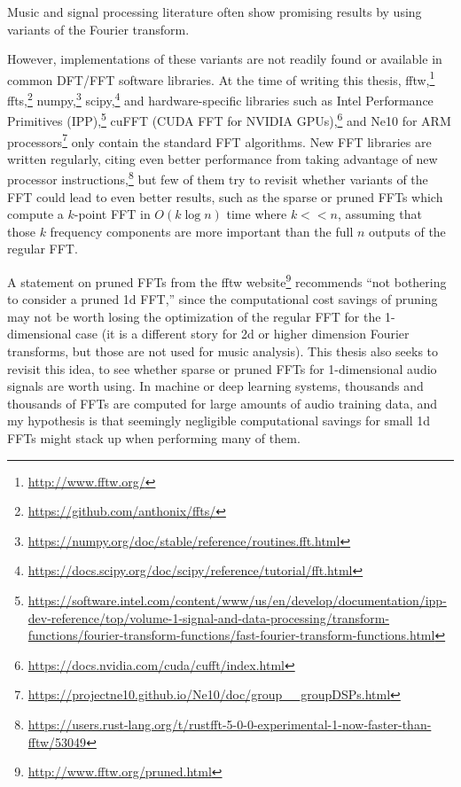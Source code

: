 \documentclass[letter,12pt]{article}
\begin{document}
Music and signal processing literature often show promising results by using variants of the Fourier transform.

However, implementations of these variants are not readily found or available in common DFT/FFT software libraries. At the time of writing this thesis, fftw,\footnote{\href{http://www.fftw.org/}{http://www.fftw.org/}} ffts,\footnote{\href{https://github.com/anthonix/ffts/}{https://github.com/anthonix/ffts/}} numpy,\footnote{\href{https://numpy.org/doc/stable/reference/routines.fft.html}{https://numpy.org/doc/stable/reference/routines.fft.html}} scipy,\footnote{\href{https://docs.scipy.org/doc/scipy/reference/tutorial/fft.html}{https://docs.scipy.org/doc/scipy/reference/tutorial/fft.html}} and hardware-specific libraries such as Intel Performance Primitives (IPP),\footnote{\href{https://software.intel.com/content/www/us/en/develop/documentation/ipp-dev-reference/top/volume-1-signal-and-data-processing/transform-functions/fourier-transform-functions/fast-fourier-transform-functions.html}{https://software.intel.com/content/www/us/en/develop/documentation/ipp-dev-reference/top/volume-1-signal-and-data-processing/transform-functions/fourier-transform-functions/fast-fourier-transform-functions.html}} cuFFT (CUDA FFT for NVIDIA GPUs),\footnote{\href{https://docs.nvidia.com/cuda/cufft/index.html}{https://docs.nvidia.com/cuda/cufft/index.html}} and Ne10 for ARM processors\footnote{\href{https://projectne10.github.io/Ne10/doc/group__groupDSPs.html}{https://projectne10.github.io/Ne10/doc/group\_\_groupDSPs.html}} only contain the standard FFT algorithms. New FFT libraries are written regularly, citing even better performance from taking advantage of new processor instructions,\footnote{\href{https://users.rust-lang.org/t/rustfft-5-0-0-experimental-1-now-faster-than-fftw/53049}{https://users.rust-lang.org/t/rustfft-5-0-0-experimental-1-now-faster-than-fftw/53049}} but few of them try to revisit whether variants of the FFT could lead to even better results, such as the sparse or pruned FFTs which compute a $k$-point FFT in $O(k \log n)$ time where $k << n$, assuming that those $k$ frequency components are more important than the full $n$ outputs of the regular FFT.

A statement on pruned FFTs from the fftw website\footnote{\href{http://www.fftw.org/pruned.html}{http://www.fftw.org/pruned.html}} recommends ``not bothering to consider a pruned 1d FFT,'' since the computational cost savings of pruning may not be worth losing the optimization of the regular FFT for the 1-dimensional case (it is a different story for 2d or higher dimension Fourier transforms, but those are not used for music analysis). This thesis also seeks to revisit this idea, to see whether sparse or pruned FFTs for 1-dimensional audio signals are worth using. In machine or deep learning systems, thousands and thousands of FFTs are computed for large amounts of audio training data, and my hypothesis is that seemingly negligible computational savings for small 1d FFTs might stack up when performing many of them.
\end{document}
